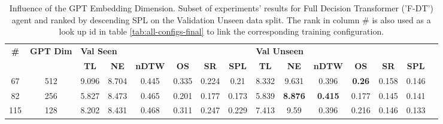 \begin{table}
\centering
\caption{\label{tab:f_dt_dim_test}Influence of the GPT Embedding Dimension. Subset of experiments' results for Full Decision Transformer ('F-DT') agent and ranked by descending SPL on the Validation Unseen data split. The rank in column \# is also used as a look up id in table \ref{tab:all-configs-final} to link the corresponding training configuration.}
\begin{tabular}{@{\hskip3pt}c@{\hskip3pt}c@{\hskip3pt}c@{\hskip3pt}c@{\hskip3pt}c@{\hskip3pt}c@{\hskip3pt}c@{\hskip3pt}c@{\hskip3pt}c@{\hskip3pt}c@{\hskip3pt}c@{\hskip3pt}c@{\hskip3pt}c@{\hskip3pt}c@{\hskip3pt}c}
\toprule
\textbf{\#} & \textbf{GPT Dim} & \multicolumn{6}{l}{\textbf{Val Seen}} & \multicolumn{6}{l}{\textbf{Val Unseen}} \\
 \textbf{~} &       \textbf{~} &       \textbf{TL} & \textbf{NE} & \textbf{nDTW} & \textbf{OS} & \textbf{SR} & \textbf{SPL} &         \textbf{TL} &     \textbf{NE} &   \textbf{nDTW} &    \textbf{OS} & \textbf{SR} & \textbf{SPL} \\
\midrule
         67 &              512 &             9.096 &       8.704 &         0.445 &       0.335 &       0.224 &         0.21 &               8.332 &           9.631 &           0.396 &  \textbf{0.26} &       0.158 &        0.146 \\
         82 &              256 &             5.827 &       8.473 &         0.465 &       0.201 &       0.177 &        0.173 &               5.839 &  \textbf{8.876} &  \textbf{0.415} &          0.177 &       0.145 &        0.141 \\
        115 &              128 &             8.202 &       8.431 &         0.468 &       0.311 &       0.247 &        0.229 &               7.413 &            9.59 &           0.396 &          0.216 &       0.146 &        0.133 \\
\bottomrule
\end{tabular}
\end{table}
